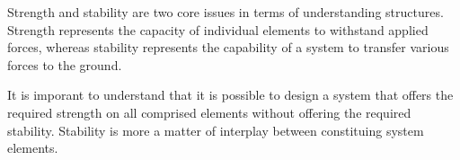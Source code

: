 Strength and stability are two core issues in terms of understanding
structures. Strength represents the capacity of individual elements to
withstand applied forces, whereas stability represents the capability of a
system to transfer various forces to the ground.

It is imporant to understand that it is possible to design a system that offers
the required strength on all comprised elements without offering the required
stability. Stability is more a matter of interplay between constituing system
elements.
